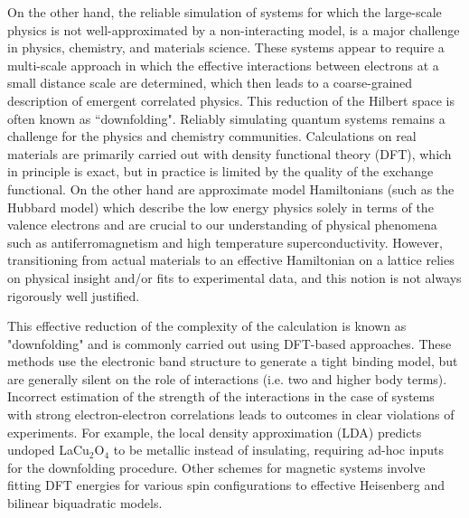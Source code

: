 \documentclass[prl,12pt,onecolumn,nofootinbib,notitlepage,english,superscriptaddress]{revtex4-1}
\newcommand{\HJC}[1]{{\color{RED}{\bf HJC: #1}}}
\begin{document}
\HJC{Downfolding: How should we connect our intuitive understanding of coarse graining with condensed matter concepts}
On the other hand, the reliable simulation of systems for which the large-scale physics is not well-approximated by a non-interacting model, is a major challenge in physics, chemistry, and materials science. These systems appear to require a multi-scale approach in which the effective interactions between electrons at a small distance scale are determined, which then leads to a coarse-grained description of emergent correlated physics. This reduction of the Hilbert space is often known as ``downfolding".
Reliably simulating quantum systems remains a challenge 
for the physics and chemistry communities. Calculations on real materials 
are primarily carried out with density functional theory (DFT), 
which in principle is exact, but in practice is limited by the quality of the exchange functional. 
On the other hand are approximate model Hamiltonians (such as the Hubbard model) 
which describe the low energy physics solely in terms of the valence electrons and 
are crucial to our understanding of physical phenomena such 
as antiferromagnetism and high temperature superconductivity. 
However, transitioning from actual materials to an effective Hamiltonian on a lattice relies 
on physical insight and/or fits to experimental data, and this notion is not always rigorously well justified.

\HJC{How has downfolding been performed in the literature. Any success stories or limitations?} 
This effective reduction of the complexity of the calculation is known as "downfolding" 
and is commonly carried out using DFT-based approaches. 
These methods use the electronic band structure to generate a tight binding model, 
but are generally silent on the role of interactions (i.e. two and higher body terms). 
Incorrect estimation of the strength of the interactions 
in the case of systems with strong electron-electron correlations leads to 
outcomes in clear violations of experiments. For example, the local density 
approximation (LDA) predicts undoped LaCu$_2$O$_4$ 
to be metallic instead of insulating, requiring ad-hoc inputs for 
the downfolding procedure. Other schemes for magnetic systems involve fitting DFT energies for 
various spin configurations to effective Heisenberg and bilinear biquadratic models.    
\end{document}
